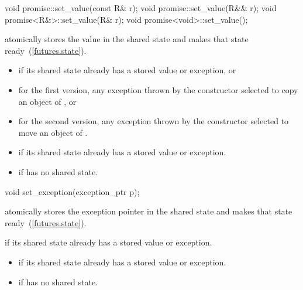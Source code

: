 %
%
\begin{itemdecl}
void promise::set_value(const R& r);
void promise::set_value(R&& r);
void promise<R&>::set_value(R& r);
void promise<void>::set_value();
\end{itemdecl}

\begin{itemdescr}
\pnum
\effects atomically stores the value  in the shared state and
makes that state ready~(\ref{futures.state}).

\pnum
\throws

\begin{itemize}
\item {} if its shared state
already has a stored value or exception, or
\item for the first version, any exception thrown by the constructor selected to copy an object of , or
\item for the second version, any exception thrown by the constructor selected to move an object of .
\end{itemize}

\pnum
\errors
\begin{itemize}
\item {} if its shared state
already has a stored value or exception.
\item {} if  has no shared state.
\end{itemize}
\end{itemdescr}

%
%
\begin{itemdecl}
void set_exception(exception_ptr p);
\end{itemdecl}

\begin{itemdescr}
\pnum
\effects atomically stores the exception pointer  in the shared state
and makes that state ready~(\ref{futures.state}).

\pnum
\throws {} if its shared state
already has a stored value or exception.

\pnum
\errors

\begin{itemize}
\item {} if its shared state
already has a stored value or exception.
\item {} if  has no shared state.
\end{itemize}
\end{itemdescr}

